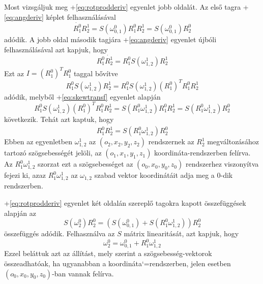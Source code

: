 \documentclass[12pt,a4paper]{report}
\theoremstyle{remark}
\theoremstyle{definition}
\begin{document}
Most vizsgáljuk meg \az+\eqref{eq:rotprodderiv} egyenlet jobb oldalát. Az első tagra \az+\eqref{eq:angderiv} képlet 
felhasználásával 
\begin{equation}
\dot{R^{0}_{1}} R^{1}_{2} = S(\omega^{0}_{0,1}) R^{0}_{1} R^{1}_{2} = S(\omega^{0}_{0,1}) R^{0}_{2}
\end{equation}
adódik. A jobb oldal második tagjára \az+\eqref{eq:angderiv} egyenlet újbóli felhasználásával azt kapjuk, hogy
\begin{equation}
R^{0}_{1} \dot{R^{1}_{2}} = R^{0}_{1} S(\omega^{1}_{1,2}) R^{1}_{2}
\end{equation}
Ezt az $I= (R^{0}_{1})^T R^{0}_{1}$ taggal bővítve
\begin{equation}
R^{0}_{1} S(\omega^{1}_{1,2}) R^{1}_{2} = R^{0}_{1} S(\omega^{1}_{1,2}) (R^{0}_{1})^T R^{0}_{1} R^{1}_{2}
\end{equation}
adódik, melyből \az+\eqref{eq:skewtransf} egyenlet alapján
\begin{equation}
R^{0}_{1} S(\omega^{1}_{1,2}) (R^{0}_{1})^T R^{0}_{1} R^{1}_{2}
    = S(R^{0}_{1}\omega^{1}_{1,2}) R^{0}_{1} R^{1}_{2}
    = S(R^{0}_{1}\omega^{1}_{1,2}) R^{0}_{2}
\end{equation}
következik. Tehát azt kaptuk, hogy
\begin{equation}
R^{0}_{1} \dot{R^{1}_{2}} = S(R^{0}_{1}\omega^{1}_{1,2}) R^{0}_{2}
\end{equation}
Ebben az egyenletben $\omega^{1}_{1,2}$ az $(o_2, x_2, y_2, z_2)$ rendszernek az $R^{1}_{2}$ megváltozásához tartozó 
szögsebességét jelöli, az $(o_1, x_1, y_1, z_1)$ koordináta-rendszerben felírva. Az $R^{0}_{1}\omega^{1}_{1,2}$ 
szorzat ezt a szögsebességet az $(o_0, x_0, y_0, z_0)$ rendszerhez viszonyítva fejezi ki, azaz 
$R^{0}_{1}\omega^{1}_{1,2}$ az $\omega_{1,2}$ szabad vektor koordinátáit adja meg a $0$-dik rendszerben.

\Az+\eqref{eq:rotprodderiv} egyenlet két oldalán szereplő tagokra kapott összefüggések alapján az
\begin{equation}
S(\omega^{0}_{2})R^{0}_{2} = \left(S(\omega^{0}_{0,1}) + S(R^{0}_{1}\omega^{1}_{1,2})\right) R^{0}_{2}
\end{equation}
összefüggés adódik. Felhasználva az $S$ mátrix linearitását, azt kapjuk, hogy
\begin{equation}
\omega^{0}_{2} = \omega^{0}_{0,1} + R^{0}_{1}\omega^{1}_{1,2}
\end{equation}
Ezzel beláttuk azt az állítást, mely szerint a szögsebesség-vektorok összeadhatóak, ha ugyanabban a 
koordináta`=rendszerben, jelen esetben $(o_0, x_0, y_0, z_0)$-ban vannak felírva.
\end{document}
